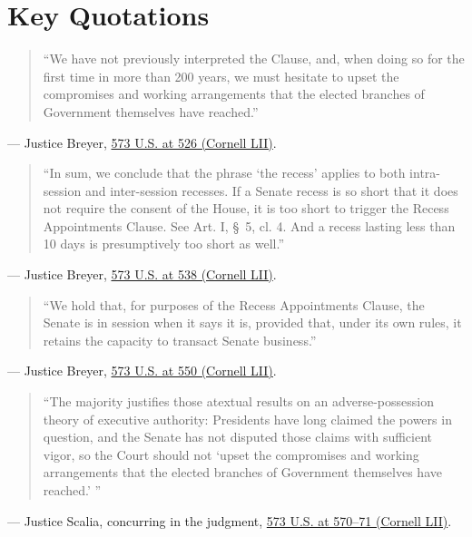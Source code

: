 \documentclass[12pt]{article}
\begin{document}
\section{Key Quotations}
\begin{quote}
``We have not previously interpreted the Clause, and, when doing so for the first time in more than 200 years, we must hesitate to upset the compromises and working arrangements that the elected branches of Government themselves have reached.''
\end{quote}
\noindent --- Justice Breyer, \href{https://www.law.cornell.edu/supremecourt/text/12-1281}{573 U.S. at 526 (Cornell LII)}.

\begin{quote}
``In sum, we conclude that the phrase `the recess' applies to both intra-session and inter-session recesses. If a Senate recess is so short that it does not require the consent of the House, it is too short to trigger the Recess Appointments Clause. See Art. I, \S~5, cl. 4. And a recess lasting less than 10 days is presumptively too short as well.''
\end{quote}
\noindent --- Justice Breyer, \href{https://www.law.cornell.edu/supremecourt/text/12-1281}{573 U.S. at 538 (Cornell LII)}.

\begin{quote}
``We hold that, for purposes of the Recess Appointments Clause, the Senate is in session when it says it is, provided that, under its own rules, it retains the capacity to transact Senate business.''
\end{quote}
\noindent --- Justice Breyer, \href{https://www.law.cornell.edu/supremecourt/text/12-1281}{573 U.S. at 550 (Cornell LII)}.

\begin{quote}
``The majority justifies those atextual results on an adverse-possession theory of executive authority: Presidents have long claimed the powers in question, and the Senate has not disputed those claims with sufficient vigor, so the Court should not `upset the compromises and working arrangements that the elected branches of Government themselves have reached.' ''
\end{quote}
\noindent --- Justice Scalia, concurring in the judgment, \href{https://www.law.cornell.edu/supremecourt/text/12-1281}{573 U.S. at 570--71 (Cornell LII)}.
\end{document}
